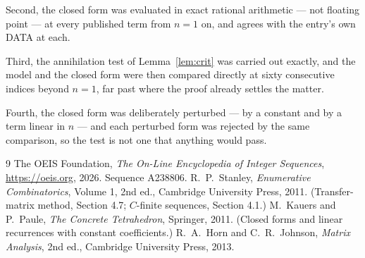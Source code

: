 \documentclass[11pt,a4paper]{article}
\theoremstyle{plain}
\theoremstyle{definition}
\begin{document}
Second, the closed form was evaluated in exact rational arithmetic --- not floating point ---
at every published term from $n=1$ on, and agrees with the entry's own DATA at each.

Third, the annihilation test of Lemma~\ref{lem:crit} was carried out exactly, and the model
and the closed form were then compared directly at sixty consecutive indices beyond
$n=1$, far past where the proof already settles the matter.

Fourth, the closed form was deliberately perturbed --- by a constant and by a term linear in
$n$ --- and each perturbed form was rejected by the same comparison, so the test is not one
that anything would pass.

\begin{thebibliography}{9}
 The OEIS Foundation, \emph{The On-Line Encyclopedia of Integer
Sequences}, \url{https://oeis.org}, 2026. Sequence A238806.
 R.~P.~Stanley, \emph{Enumerative Combinatorics}, Volume 1, 2nd ed.,
Cambridge University Press, 2011. (Transfer-matrix method, Section 4.7; $C$-finite sequences,
Section 4.1.)
 M.~Kauers and P.~Paule, \emph{The Concrete Tetrahedron}, Springer, 2011.
(Closed forms and linear recurrences with constant coefficients.)
 R.~A.~Horn and C.~R.~Johnson, \emph{Matrix Analysis}, 2nd ed., Cambridge
University Press, 2013.
\end{thebibliography}
\end{document}
